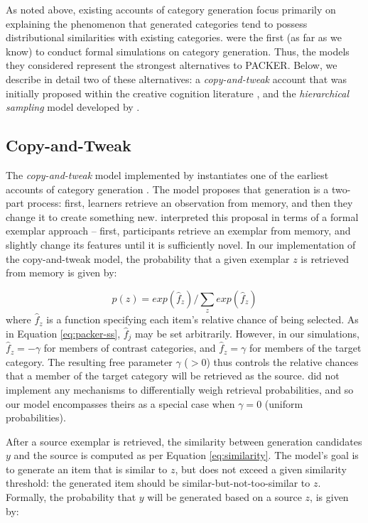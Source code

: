 \documentclass[10pt,letterpaper]{article}
\begin{document}
As noted above, existing accounts of category generation focus primarily on explaining the phenomenon that generated categories tend to possess distributional similarities with existing categories. \citet{jern2013probabilistic} were the first (as far as we know) to conduct formal simulations on category generation. Thus, the models they considered represent the strongest alternatives to PACKER. Below, we describe in detail two of these alternatives: a \textit{copy-and-tweak} account that was initially proposed within the creative cognition literature \citep{ward2002role,ward1995s}, and the \textit{hierarchical sampling} model developed by \citet{jern2013probabilistic}.


\subsection{Copy-and-Tweak}

The \textit{copy-and-tweak} model implemented by \citet{jern2013probabilistic} instantiates one of the earliest accounts of category generation \citep[see][]{ward2002role,ward1995s}. The model proposes that generation is a two-part process: first, learners retrieve an observation from memory, and then they change it to create something new. \citet{jern2013probabilistic} interpreted this proposal in terms of a formal exemplar approach -- first, participants retrieve an exemplar from memory, and slightly change its features until it is sufficiently novel. In our implementation of the copy-and-tweak model, the probability that a given exemplar $z$ is retrieved from memory is given by: 

\begin{equation}
p(z) = exp(\hat{f}_z) / \sum_z{ exp(\hat{f}_z) }
\end{equation}
%
where $\hat{f}_z$ is a function specifying each item's relative chance of being selected. As in Equation \ref{eq:packer-ss}, $\hat{f}_j$ may be set arbitrarily. However, in our simulations, $\hat{f}_z = -\gamma$ for members of contrast categories, and $\hat{f}_z = \gamma$ for members of the target category. The resulting free parameter $\gamma$ ($>0$) thus controls the relative chances that a member of the target category will be retrieved as the source. \citet{jern2013probabilistic} did not implement any mechanisms to differentially weigh retrieval probabilities, and so our model encompasses theirs as a special case when $\gamma = 0$ (uniform probabilities).

After a source exemplar is retrieved, the similarity between generation candidates $y$ and the source is computed as per Equation \ref{eq:similarity}. The model's goal is to generate an item that is similar to $z$, but does not exceed a given similarity threshold: the generated item should be similar-but-not-too-similar to $z$. Formally, the probability that $y$ will be generated based on a source $z$, is given by:
\end{document}
